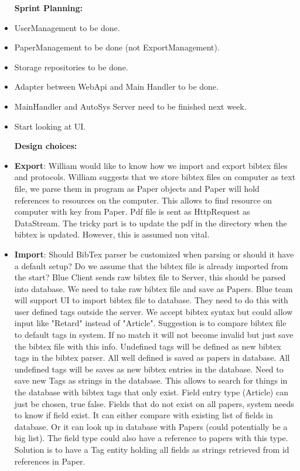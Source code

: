 \begin{itemize}
	\item [\textbf{Sprint Planning:}]
	\item UserManagement to be done. 
	\item PaperManagement to be done (not ExportManagement). 
	\item Storage repositories to be done. 
	\item Adapter between WebApi and Main Handler to be done. 
	\item MainHandler and AutoSys Server need to be finished next week. 
	\item Start looking at UI. 
\end{itemize}

\begin{itemize}
	\item [\textbf{Design choices:}]
	\item \textbf{Export}: William would like to know how we import and export bibtex files and protocols. William suggests that we store bibtex files on computer as text file, we parse them in program as Paper objects and Paper will hold references to resources on the computer. This allows to find resource on computer with key from Paper. Pdf file is sent as HttpRequest as DataStream. The tricky part is to update the pdf in the directory when the bibtex is updated. However, this is assumed non vital.
	\item \textbf{Import}: Should BibTex parser be customized when parsing or should it have a default setup? Do we assume that the bibtex file is already imported from the start? Blue Client sends raw bibtex file to Server, this should be parsed into database. We need to take raw bibtex file and save as Papers. Blue team will support UI to import bibtex file to database. They need to do this with user defined tags outside the server. We accept bibtex syntax but could allow input like "Retard" instead of "Article". Suggestion is to compare bibtex file to default tags in system. If no match it will not become invalid but just save the bibtex file with this info. Undefined tags will be defined as new bibtex tags in the bibtex parser. All well defined is saved as papers in database. All undefined tags will be saves as new bibtex entries in the database. Need to save new Tags as strings in the database. This allows to search for things in the database with bibtex tags that only exist. Field entry type (Article) can just be chosen, true false. Fields that do not exist on all papers, system needs to know if field exist. It can either compare with existing list of fields in database. Or it can look up in database with Papers (could potentially be a big list). The field type could also have a reference to papers with this type. Solution is to have a Tag entity holding all fields as strings retrieved from id references in Paper. 

\end{itemize}
